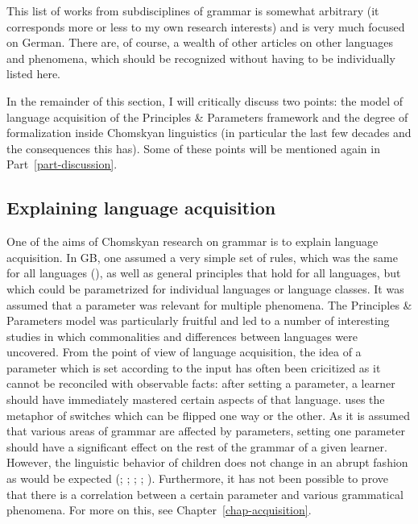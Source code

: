 This list of works from subdisciplines of grammar is somewhat arbitrary (it corresponds more or less to my own
research interests) and is very much focused on German. There are, of course, a wealth of other articles on other
languages and phenomena, which should be recognized without having to be individually listed here.

In the remainder of this section, I will critically discuss two points: the model of language acquisition of the Principles
\& Parameters framework and the degree of formalization inside Chomskyan linguistics (in particular the last few decades
and the consequences this has). Some of these points will be mentioned again in Part~\ref{part-discussion}. 

\subsection{Explaining language acquisition}
\label{sec-acquisition-gb}

One of the aims of Chomskyan research on grammar is to explain language acquisition. In GB, one
assumed a very simple set of rules, which was the same for all languages (\xbart), as well as
general principles that hold for all languages, but which could be parametrized for individual
languages or language classes. It was assumed that a parameter was relevant for multiple phenomena.
The Principles \& Parameters model was particularly fruitful and led to a number of interesting
studies in which commonalities and differences between languages were uncovered. From the point of
view of language acquisition, the idea of a parameter which is set according to the input has often
been cricitized as it cannot be reconciled with observable facts: after setting a parameter, a
learner should have immediately mastered certain aspects of that language. \citet[]{Chomsky86a} uses the metaphor of switches which can be flipped one way or the other. As it is
assumed that various areas of grammar are affected by parameters, setting one parameter should have
a significant effect on the rest of the grammar of a given learner.  However, the linguistic
behavior of children does not change in an abrupt fashion as would be expected (\citealp[]{Bloom93a}; \citealp[]{Haider93a}; \citealp[]{Abney96a};
\citealp[Section~9.1]{AW98a}; \citealp{Tomasello2000a,Tomasello2003a}).
Furthermore, it has not been possible to prove that there is
a correlation between a certain parameter and various grammatical phenomena. For more on this, see
Chapter~\ref{chap-acquisition}.

